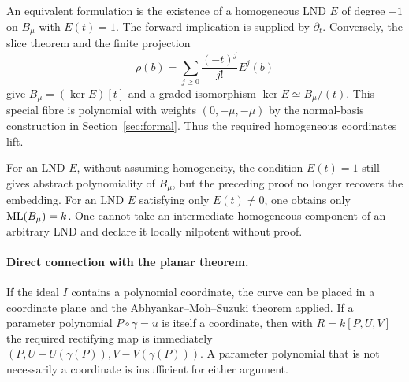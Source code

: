An equivalent formulation is the existence of a homogeneous LND $E$
of degree $-1$ on $B_\mu$ with $E(t)=1$. The forward implication
is supplied by $\partial_t$. Conversely, the slice theorem and the finite projection
\[
\rho(b)=\sum_{j\ge0}\frac{(-t)^j}{j!}E^j(b)
\]
give $B_\mu=(\ker E)[t]$ and a graded isomorphism
$\ker E\simeq B_\mu/(t)$. This special fibre is polynomial with weights
$(0,-\mu,-\mu)$ by the normal-basis construction in Section~\ref{sec:formal}.
Thus the required homogeneous coordinates lift.

For an LND $E$, without assuming homogeneity, the condition $E(t)=1$
still gives abstract polynomiality of $B_\mu$, but the preceding proof
no longer recovers the embedding.
For an LND $E$ satisfying only $E(t)\ne0$, one obtains only $\operatorname{ML}(B_\mu)=k$.
One cannot take an intermediate homogeneous component of an arbitrary LND
and declare it locally nilpotent without proof.

\paragraph{Direct connection with the planar theorem.}
If the ideal $I$ contains a polynomial coordinate, the curve can be placed
in a coordinate plane and the Abhyankar--Moh--Suzuki theorem applied.
If a parameter polynomial $P\circ\gamma=u$ is itself a coordinate, then
with $R=k[P,U,V]$ the required rectifying map is immediately
$(P,U-U(\gamma(P)),V-V(\gamma(P)))$.
A parameter polynomial that is not necessarily a coordinate is
insufficient for either argument.
